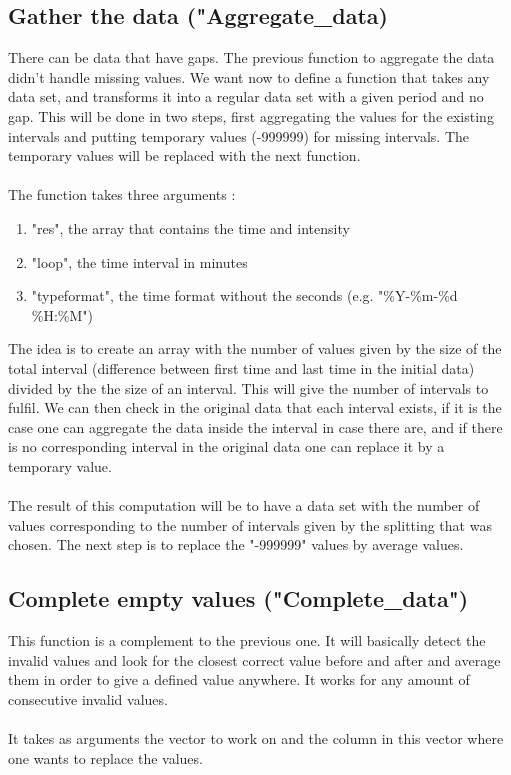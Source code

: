 \documentclass[a4wide,12pt]{article}
\begin{document}
\subsection{Gather the data ("Aggregate\_data)}
There can be data that have gaps. The previous function to aggregate the data didn't handle missing values. We want now to define a function that takes any data set, and transforms it into a regular data set with a given period and no gap. This will be done in two steps, first aggregating the values for the existing intervals and putting temporary values (-999999) for missing intervals. The temporary values will be replaced with the next function.
\\ \\
The function takes three arguments : 
\begin{enumerate}
\item "res", the array that contains the time and intensity
\item "loop", the time interval in minutes
\item "typeformat", the time format without the seconds (e.g. "\%Y-\%m-\%d \%H:\%M")
\end{enumerate}

The idea is to create an array with the number of values given by the size of the total interval (difference between first time and last time in the initial data) divided by the the size of an interval. This will give the number of intervals to fulfil. We can then check in the original data that each interval exists, if it is the case one can aggregate the data inside the interval in case there are, and if there is no corresponding interval in the original data one can replace it by a temporary value. 
\\ \\
The result of this computation will be to have a data set with the number of values corresponding to the number of intervals given by the splitting that was chosen. The next step is to replace the "-999999" values by average values.

\subsection{Complete empty values ("Complete\_data")}
This function is a complement to the previous one. It will basically detect the invalid values and look for the closest correct value before and after and average them in order to give a defined value anywhere. It works for any amount of consecutive invalid values. 
\\ \\
It takes as arguments the vector to work on and the column in this vector where one wants to replace the values.
\end{document}
